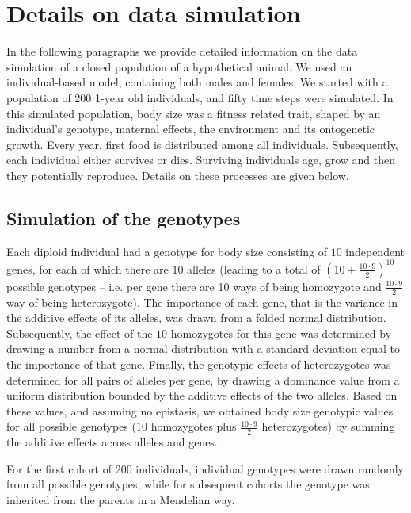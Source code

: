 \section{Details on data simulation} \label{app:simul}
In the following paragraphs we provide detailed information on the data simulation of a closed population of a hypothetical animal. We used an individual-based model, containing both males and females. We started with a population of 200 1-year old individuals, and fifty time steps were simulated. In this simulated population, body size was a fitness related trait, shaped by an individual's genotype, maternal effects, the environment and its ontogenetic growth. Every year, first food is distributed among all individuals. Subsequently, each individual either survives or dies. Surviving individuals age, grow and then they potentially reproduce. Details on these processes are given below.

\subsection{Simulation of the genotypes} \label{app:simul:gen}
Each diploid individual had a genotype for body size consisting of $10$ independent genes, for each of which there are $10$ alleles (leading to a total of $(10+\frac{10\cdot9}{2})^{10}$ possible genotypes -- i.e. per gene there are 10 ways of being homozygote and $\frac{10\cdot 9}{2}$ way of being heterozygote). The importance of each gene, that is the variance in the additive effects of its alleles, was drawn from a folded normal distribution. Subsequently, the effect of the $10$ homozygotes for this gene was determined by drawing a number from a normal distribution with a standard deviation equal to the importance of that gene. Finally, the genotypic effects of heterozygotes was determined for all pairs of alleles per gene, by drawing a dominance value from a uniform distribution bounded by the additive effects of the two alleles. Based on these values, and assuming no epistasis, we obtained body size genotypic values for all possible genotypes ($10$ homozygotes plus $\frac{10\cdot 9}{2}$ heterozygotes) by summing the additive effects across alleles and genes.

For the first cohort of 200 individuals, individual genotypes were drawn randomly from all possible genotypes, while for subsequent cohorts the genotype was inherited from the parents in a Mendelian way.

